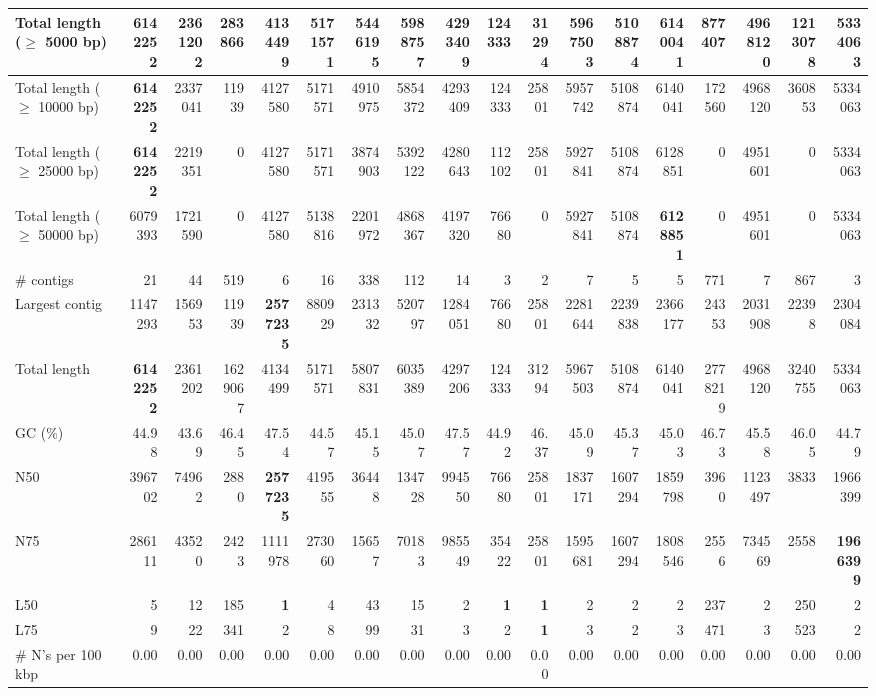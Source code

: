 \documentclass[12pt,a4paper]{article}
\begin{document}
\begin{table}[ht]
\begin{center}
\begin{tabular}{|l*{17}{|r}|}
Total length ($\geq$ 5000 bp) & {\bf 6142252} & 2361202 & 283866 & 4134499 & 5171571 & 5446195 & 5988757 & 4293409 & 124333 & 31294 & 5967503 & 5108874 & 6140041 & 877407 & 4968120 & 1213078 & 5334063 \\ \hline
Total length ($\geq$ 10000 bp) & {\bf 6142252} & 2337041 & 11939 & 4127580 & 5171571 & 4910975 & 5854372 & 4293409 & 124333 & 25801 & 5957742 & 5108874 & 6140041 & 172560 & 4968120 & 360853 & 5334063 \\ \hline
Total length ($\geq$ 25000 bp) & {\bf 6142252} & 2219351 & 0 & 4127580 & 5171571 & 3874903 & 5392122 & 4280643 & 112102 & 25801 & 5927841 & 5108874 & 6128851 & 0 & 4951601 & 0 & 5334063 \\ \hline
Total length ($\geq$ 50000 bp) & 6079393 & 1721590 & 0 & 4127580 & 5138816 & 2201972 & 4868367 & 4197320 & 76680 & 0 & 5927841 & 5108874 & {\bf 6128851} & 0 & 4951601 & 0 & 5334063 \\ \hline
\# contigs & 21 & 44 & 519 & 6 & 16 & 338 & 112 & 14 & 3 & 2 & 7 & 5 & 5 & 771 & 7 & 867 & 3 \\ \hline
Largest contig & 1147293 & 156953 & 11939 & {\bf 2577235} & 880929 & 231332 & 520797 & 1284051 & 76680 & 25801 & 2281644 & 2239838 & 2366177 & 24353 & 2031908 & 22398 & 2304084 \\ \hline
Total length & {\bf 6142252} & 2361202 & 1629067 & 4134499 & 5171571 & 5807831 & 6035389 & 4297206 & 124333 & 31294 & 5967503 & 5108874 & 6140041 & 2778219 & 4968120 & 3240755 & 5334063 \\ \hline
GC (\%) & 44.98 & 43.69 & 46.45 & 47.54 & 44.57 & 45.15 & 45.07 & 47.57 & 44.92 & 46.37 & 45.09 & 45.37 & 45.03 & 46.73 & 45.58 & 46.05 & 44.79 \\ \hline
N50 & 396702 & 74962 & 2880 & {\bf 2577235} & 419555 & 36448 & 134728 & 994550 & 76680 & 25801 & 1837171 & 1607294 & 1859798 & 3960 & 1123497 & 3833 & 1966399 \\ \hline
N75 & 286111 & 43520 & 2423 & 1111978 & 273060 & 15657 & 70183 & 985549 & 35422 & 25801 & 1595681 & 1607294 & 1808546 & 2556 & 734569 & 2558 & {\bf 1966399} \\ \hline
L50 & 5 & 12 & 185 & {\bf 1} & 4 & 43 & 15 & 2 & {\bf 1} & {\bf 1} & 2 & 2 & 2 & 237 & 2 & 250 & 2 \\ \hline
L75 & 9 & 22 & 341 & 2 & 8 & 99 & 31 & 3 & 2 & {\bf 1} & 3 & 2 & 3 & 471 & 3 & 523 & 2 \\ \hline
\# N's per 100 kbp & 0.00 & 0.00 & 0.00 & 0.00 & 0.00 & 0.00 & 0.00 & 0.00 & 0.00 & 0.00 & 0.00 & 0.00 & 0.00 & 0.00 & 0.00 & 0.00 & 0.00 \\ \hline
\end{tabular}
\end{center}
\end{table}
\end{document}
